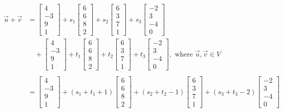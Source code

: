 \documentclass[12pt, a4paper]{article}
\begin{document}
\begin{enumerate}[Q\arabic*.]
\begin{align*}
      \vec{u} + \vec{v} &= \begin{bmatrix}4\\-3\\9\\1\end{bmatrix} + s_1\begin{bmatrix}6\\6\\8\\2\end{bmatrix} + s_2\begin{bmatrix}6\\3\\7\\1\end{bmatrix} + s_3\begin{bmatrix}-2\\3\\-4\\0\end{bmatrix}\\
      &\quad+ \begin{bmatrix}4\\-3\\9\\1\end{bmatrix} + t_1\begin{bmatrix}6\\6\\8\\2\end{bmatrix} + t_2\begin{bmatrix}6\\3\\7\\1\end{bmatrix} + t_3\begin{bmatrix}-2\\3\\-4\\0\end{bmatrix},\text{ where }\vec{u}, \vec{v} \in V\\\\
      &= \begin{bmatrix}4\\-3\\9\\1\end{bmatrix} + (s_1+t_1+1)\begin{bmatrix}6\\6\\8\\2\end{bmatrix} + (s_2+t_2-1)\begin{bmatrix}6\\3\\7\\1\end{bmatrix} + (s_3+t_3-2)\begin{bmatrix}-2\\3\\-4\\0\end{bmatrix}\\

\end{align*}
\end{enumerate}
\end{document}
